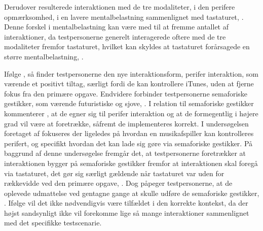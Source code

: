 Derudover resulterede interaktionen med de tre modaliteter, i den perifere opmærksomhed, i en lavere mentalbelastning sammenlignet med tastaturet, \parencite[s. 172]{PDF:ComparingInputModalities}. Denne forskel i mentalbelastning kan være med til at fremme antallet af interaktioner, da testpersonerne generelt interagerede oftere med de tre modaliteter fremfor tastaturet, hvilket kan skyldes at tastaturet forårsagede en større mentalbelastning, \parencite[ss. 174-175]{PDF:ComparingInputModalities}.    

Ifølge \textcite[ss. 173-174]{PDF:ComparingInputModalities}, så finder testpersonerne den nye interaktionsform, perifer interaktion, som værende et positivt tiltag, særligt fordi de kan kontrollere iTunes, uden at fjerne fokus fra den primære opgave. Endvidere forbinder testpersonerne semaforiske gestikker, som værende futuristiske og sjove, \parencite[s. 174]{PDF:ComparingInputModalities}. I relation til semaforiske gestikker kommenterer \textcite[s. 177]{PDF:ComparingInputModalities}, at de egner sig til perifer interaktion og at de formegentlig i højere grad vil være at foretrække, såfremt de implementeres korrekt.\blankline
%                    
I undersøgelsen foretaget af \textcite{PDF:AStudyOnTheUseOfSemaphoricGestures} fokuseres der ligeledes på hvordan en musikafspiller kan kontrolleres perifert, og specifikt hvordan det kan lade sig gøre via semaforiske gestikker. På baggrund af denne undersøgelse fremgår det, at testpersonerne foretrækker at interaktionen bygger på semaforiske gestikker fremfor at interaktionen skal foregå via tastaturet, det gør sig særligt gældende når tastaturet var uden for rækkevidde ved den primære opgave, \parencite[s. 1963]{PDF:AStudyOnTheUseOfSemaphoricGestures}. Dog påpeger testpersonerne, at de oplevede udmattelse ved gentagne gange at skulle udføre de semaforiske gestikker, \parencite[s. 1963]{PDF:AStudyOnTheUseOfSemaphoricGestures}. Ifølge \textcite[s. 1963]{PDF:AStudyOnTheUseOfSemaphoricGestures} vil det ikke nødvendigvis være tilfældet i den korrekte kontekst, da der højst sandsynligt ikke vil forekomme lige så mange interaktioner sammenlignet med det specifikke testscenarie. 

